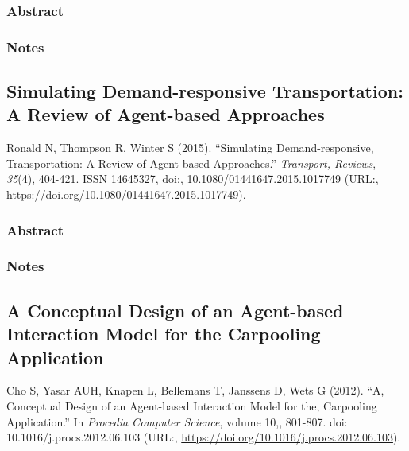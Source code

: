 \documentclass[
]{article}
\begin{document}
\hypertarget{abstract-17}{%
\subsubsection{Abstract}\label{abstract-17}}

\hypertarget{notes-17}{%
\subsubsection{Notes}\label{notes-17}}

\hypertarget{simulating-demand-responsive-transportation-a-review-of-agent-based-approaches}{%
\subsection{Simulating Demand-responsive Transportation: A Review of
Agent-based
Approaches}\label{simulating-demand-responsive-transportation-a-review-of-agent-based-approaches}}

Ronald N, Thompson R, Winter S (2015). ``Simulating Demand-responsive,
Transportation: A Review of Agent-based Approaches.'' \emph{Transport,
Reviews}, \emph{35}(4), 404-421. ISSN 14645327, doi:,
10.1080/01441647.2015.1017749 (URL:,
\url{https://doi.org/10.1080/01441647.2015.1017749}).

\hypertarget{abstract-18}{%
\subsubsection{Abstract}\label{abstract-18}}

\hypertarget{notes-18}{%
\subsubsection{Notes}\label{notes-18}}

\hypertarget{a-conceptual-design-of-an-agent-based-interaction-model-for-the-carpooling-application}{%
\subsection{A Conceptual Design of an Agent-based Interaction Model for
the Carpooling
Application}\label{a-conceptual-design-of-an-agent-based-interaction-model-for-the-carpooling-application}}

Cho S, Yasar AUH, Knapen L, Bellemans T, Janssens D, Wets G (2012). ``A,
Conceptual Design of an Agent-based Interaction Model for the,
Carpooling Application.'' In \emph{Procedia Computer Science}, volume
10,, 801-807. doi: 10.1016/j.procs.2012.06.103 (URL:,
\url{https://doi.org/10.1016/j.procs.2012.06.103}).
\end{document}

